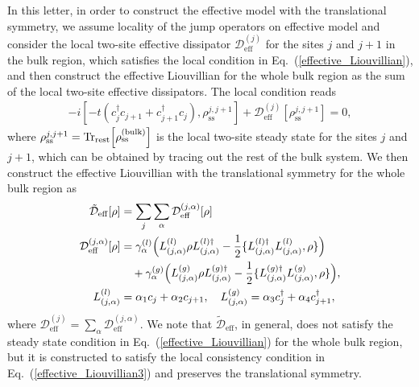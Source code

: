 \documentclass[a4paper, amsfonts, amssymb, amsmath, reprint, showkeys, nofootinbib, twoside,superscriptaddress, prl]{revtex4-2}
\newcommand{\m}[1]{\mathcal{#1}}
\newcommand{\mr}[1]{\mathrm{#1}}
\begin{document}
In this letter, in order to construct the effective model with the translational symmetry, we assume locality of the jump operators on effective model and consider the local two-site effective dissipator $\m{D}^{(j)}_{\mr{eff}}$ for the sites $j$ and $j+1$ in the bulk region, which satisfies the local condition in Eq.~(\ref{effective_Liouvillian}), and then construct the effective Liouvillian for the whole bulk region as the sum of the local two-site effective dissipators.
The local condition reads
\begin{align}
    -i[-t(c_j^{\dagger} c_{j+1} + c_{j+1}^{\dagger} c_j), \rho^{j, j+1}_{\mr{ss}}] + \m{D}^{(j)}_{\mr{eff}}[\rho^{j, j+1}_{\mr{ss}}] = 0,\label{effective_Liouvillian3}
\end{align}
where $\rho^{j, j+1}_{\mr{ss}} = \mr{Tr_{rest}}\Bigl[ \rho^{(\mr{bulk})}_{\mr{ss}} \Bigr]$ is the local two-site steady state for the sites $j$ and $j+1$, which can be obtained by tracing out the rest of the bulk system. 
We then construct the effective Liouvillian with the translational symmetry for the whole bulk region as
\begin{align}
    \tilde{\m{D}}_{\mr{eff}}[\rho] &= \sum_j \sum_{\alpha}\m{D}^{(j, \alpha)}_{\mr{eff}}[\rho]\nonumber\\
    \m{D}^{(j, \alpha)}_{\mr{eff}}[\rho] &= \gamma^{(l)}_{\alpha} \Bigl(L^{(l)}_{(j,\alpha)}\rho L^{(l)\dagger}_{(j,\alpha)} - \frac{1}{2}\{L^{(l)\dagger}_{(j,\alpha)} L^{(l)}_{(j,\alpha)}, \rho\}\Bigr)\nonumber\\
    & \quad + \gamma^{(g)}_{\alpha} \Bigl(L^{(g)}_{(j,\alpha)}\rho L^{(g)\dagger}_{(j,\alpha)} - \frac{1}{2}\{L^{(g)\dagger}_{(j,\alpha)} L^{(g)}_{(j,\alpha)}, \rho\}\Bigr),\label{effective_Liouvillian2}\\
    L^{(l)}_{(j,\alpha)} &= \alpha_1 c_j + \alpha_2 c_{j+1},\quad L^{(g)}_{(j,\alpha)} = \alpha_3 c_j^{\dagger} + \alpha_4 c_{j+1}^{\dagger},\label{jump_gain}
\end{align}
where $\m{D}^{(j)}_{\mr{eff}} = \sum_\alpha\m{D}^{(j,\alpha)}_{\mr{eff}}$. We note that $\tilde{\m{D}}_{\mr{eff}}$, in general, does not satisfy the steady state condition in Eq.~(\ref{effective_Liouvillian}) for the whole bulk region, but it is constructed to satisfy the local consistency condition in Eq.~(\ref{effective_Liouvillian3}) and preserves the translational symmetry.
\end{document}
